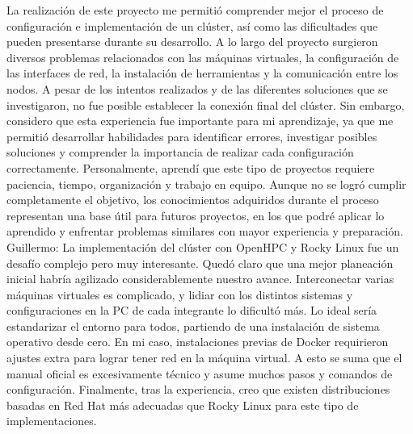 La realización de este proyecto me permitió comprender mejor el proceso de configuración e implementación de un clúster, así como las dificultades que pueden presentarse durante su desarrollo. A lo largo del proyecto surgieron diversos problemas relacionados con las máquinas virtuales, la configuración de las interfaces de red, la instalación de herramientas y la comunicación entre los nodos. A pesar de los intentos realizados y de las diferentes soluciones que se investigaron, no fue posible establecer la conexión final del clúster. Sin embargo, considero que esta experiencia fue importante para mi aprendizaje, ya que me permitió desarrollar habilidades para identificar errores, investigar posibles soluciones y comprender la importancia de realizar cada configuración correctamente. Personalmente, aprendí que este tipo de proyectos requiere paciencia, tiempo, organización y trabajo en equipo. Aunque no se logró cumplir completamente el objetivo, los conocimientos adquiridos durante el proceso representan una base útil para futuros proyectos, en los que podré aplicar lo aprendido y enfrentar problemas similares con mayor experiencia y preparación.
\\[1em]
Guillermo:
La implementación del clúster con OpenHPC y Rocky Linux fue un desafío complejo pero muy interesante. Quedó claro que una mejor planeación inicial habría agilizado considerablemente nuestro avance. Interconectar varias máquinas virtuales es complicado, y lidiar con los distintos sistemas y configuraciones en la PC de cada integrante lo dificultó más. Lo ideal sería estandarizar el entorno para todos, partiendo de una instalación de sistema operativo desde cero.
En mi caso, instalaciones previas de Docker requirieron ajustes extra para lograr tener red en la máquina virtual. A esto se suma que el manual oficial es excesivamente técnico y asume muchos pasos y comandos de configuración. Finalmente, tras la experiencia, creo que existen distribuciones basadas en Red Hat más adecuadas que Rocky Linux para este tipo de implementaciones.
